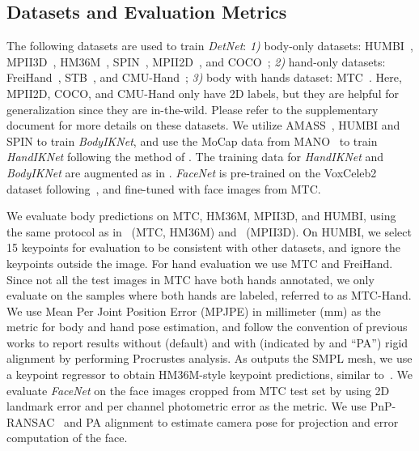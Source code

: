 \documentclass[final]{cvpr}
\begin{document}
\subsection{Datasets and Evaluation Metrics}
The following datasets are used to train \textit{DetNet}:
\textit{1)} body-only datasets: HUMBI~\cite{yu2020humbi}, MPII3D~\cite{mehta2017monocular}, HM36M~\cite{ionescu2013human3}, SPIN~\cite{kolotouros2019learning}, MPII2D~\cite{andriluka20142d}, and COCO~\cite{lin2014microsoft};
\textit{2)} hand-only datasets: FreiHand~\cite{zimmermann2019freihand}, STB~\cite{zhang2017a}, and CMU-Hand~\cite{simon2017hand};
\textit{3)} body with hands dataset: MTC~\cite{joo2018total}.
Here, MPII2D, COCO, and CMU-Hand only have 2D labels, but they are helpful for generalization since they are in-the-wild.
Please refer to the supplementary document for more details on these datasets.
We utilize AMASS~\cite{mahmood2019amass}, HUMBI and SPIN to train \textit{BodyIKNet}, and use the MoCap data from MANO~\cite{romero2017embodied} to train \textit{HandIKNet} following the method of \cite{zhou2020monocular}.
The training data for \textit{HandIKNet} and \textit{BodyIKNet} are augmented as in \cite{zhou2020monocular}.
\textit{FaceNet} is pre-trained on the VoxCeleb2~\cite{Chung18b} dataset following~\cite{tewari2017mofa}, and fine-tuned with face images from MTC.
\par
We evaluate body predictions on MTC, HM36M, MPII3D, and HUMBI, using the same protocol as in~\cite{xiang2019monocular} (MTC, HM36M) and~\cite{mehta2017vnect} (MPII3D).
On HUMBI, we select 15 keypoints for evaluation to be consistent with other datasets, and ignore the keypoints outside the image.
For hand evaluation we use MTC and FreiHand.
Since not all the test images in MTC have both hands annotated, we only evaluate on the samples where both hands are labeled, referred to as MTC-Hand.
We use Mean Per Joint Position Error (MPJPE) in millimeter (mm) as the metric for body and hand pose estimation, and follow the convention of previous works to report results without (default) and with (indicated by  and ``PA'') rigid alignment by performing Procrustes analysis.
As \cite{choutas2020monocular} outputs the SMPL mesh, we use a keypoint regressor to obtain HM36M-style keypoint predictions, similar to~\cite{kolotouros2019learning,kanazawa2018end}.
We evaluate \textit{FaceNet} on the face images cropped from MTC test set by using 2D landmark error and per channel photometric error as the metric.
We use PnP-RANSAC~\cite{fischler1981random} and PA alignment to estimate camera pose for projection and error computation of the face.
\end{document}
